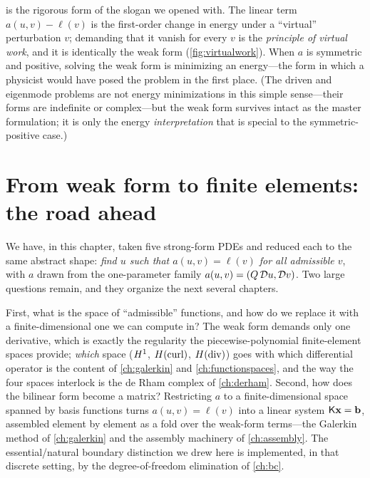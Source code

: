  is the rigorous form of the slogan we opened with. The
linear term $a(u,v)-\ell(v)$ is the first-order change in energy under a
``virtual'' perturbation $v$; demanding that it vanish for every $v$ is the
\emph{principle of virtual work}, and it is identically the weak form
(\cref{fig:virtualwork}). When $a$ is symmetric and positive, solving the weak
form is minimizing an energy---the form in which a physicist would have posed the
problem in the first place. (The driven and eigenmode problems are not energy
minimizations in this simple sense---their forms are indefinite or
complex---but the weak form survives intact as the master formulation; it is only
the energy \emph{interpretation} that is special to the symmetric-positive case.)

\section{From weak form to finite elements: the road ahead}

We have, in this chapter, taken five strong-form PDEs and reduced each to the
same abstract shape: \emph{find $u$ such that $a(u,v)=\ell(v)$ for all admissible
$v$}, with $a$ drawn from the one-parameter family $a(u,v)=(Q\,\mathcal{D} u,\mathcal{D}
v)$. Two large questions remain, and they organize the next several chapters.

First, what is the space of ``admissible'' functions, and how do we replace it
with a finite-dimensional one we can compute in? The weak form demands only one
derivative, which is exactly the regularity the piecewise-polynomial
finite-element spaces provide; \emph{which} space ($H^1$, $H(\mathrm{curl})$, $H(\mathrm{div})$)
goes with which differential operator is the content of \cref{ch:galerkin} and
\cref{ch:functionspaces}, and the way the four spaces interlock is the de Rham
complex of \cref{ch:derham}. Second, how does the bilinear form become a matrix?
Restricting $a$ to a finite-dimensional space spanned by basis functions turns
$a(u,v)=\ell(v)$ into a linear system $\mathsf{K}\mathbf{x}=\mathbf{b}$, assembled element by
element as a fold over the weak-form terms---the Galerkin method of
\cref{ch:galerkin} and the assembly machinery of \cref{ch:assembly}. The
essential/natural boundary distinction we drew here is implemented, in that
discrete setting, by the degree-of-freedom elimination of \cref{ch:bc}.


